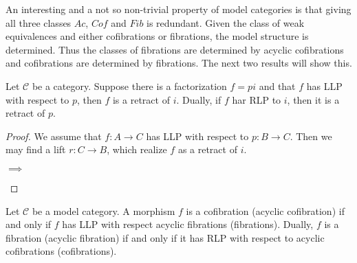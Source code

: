 \documentclass[../thesis.tex]{subfiles}
\begin{document}
            An interesting and a not so non-trivial property of model categories is that giving all three classes $Ac$, $Cof$ and $Fib$ is redundant. Given the class of weak equivalences and either cofibrations or fibrations, the model structure is determined. Thus the classes of fibrations are determined by acyclic cofibrations and cofibrations are determined by fibrations. The next two results will show this.

            \begin{lemma}\label{lem: retract-argument}
                Let $\mathcal{C}$ be a category. Suppose there is a factorization $f = pi$ and that $f$ has LLP with respect to $p$, then $f$ is a retract of $i$. Dually, if $f$ har RLP to $i$, then it is a retract of $p$.
            \end{lemma}

            \begin{proof}
                We assume that $f : A \rightarrow C$ has LLP with respect to $p : B \rightarrow C$. Then we may find a lift $r : C \rightarrow B$, which realize $f$ as a retract of $i$.
                
                \begin{center}
                     $\implies$
                \end{center}
            \end{proof}

            \begin{proposition}
                Let $\mathcal{C}$ be a model category. A morphism $f$ is a cofibration (acyclic cofibration) if and only if $f$ has LLP with respect acyclic fibrations (fibrations). Dually, $f$ is a fibration (acyclic fibration) if and only if it has RLP with respect to acyclic cofibrations (cofibrations).
            \end{proposition}
\end{document}

